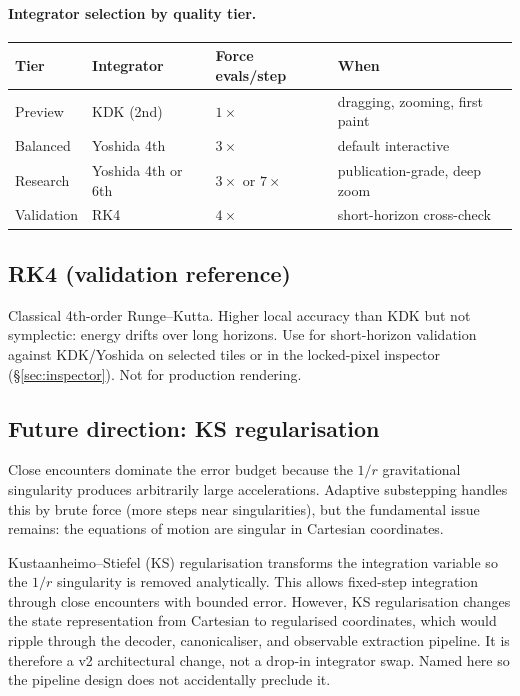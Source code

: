 \documentclass[11pt]{report}
\begin{document}
\paragraph{Integrator selection by quality tier.}
\begin{center}
\begin{tabular}{llll}
\toprule
Tier & Integrator & Force evals/step & When \\
\midrule
Preview & KDK (2nd) & $1\times$ & dragging, zooming, first paint \\
Balanced & Yoshida 4th & $3\times$ & default interactive \\
Research & Yoshida 4th or 6th & $3\times$ or $7\times$ & publication-grade, deep zoom \\
Validation & RK4 & $4\times$ & short-horizon cross-check \\
\bottomrule
\end{tabular}
\end{center}

\subsection{RK4 (validation reference)}

Classical 4th-order Runge--Kutta. Higher local accuracy than KDK but not symplectic: energy drifts over long horizons. Use for short-horizon validation against KDK/Yoshida on selected tiles or in the locked-pixel inspector (\S\ref{sec:inspector}). Not for production rendering.

\subsection{Future direction: KS regularisation}

Close encounters dominate the error budget because the $1/r$ gravitational singularity produces arbitrarily large accelerations. Adaptive substepping handles this by brute force (more steps near singularities), but the fundamental issue remains: the equations of motion are singular in Cartesian coordinates.

Kustaanheimo--Stiefel (KS) regularisation transforms the integration variable so the $1/r$ singularity is removed analytically. This allows fixed-step integration through close encounters with bounded error. However, KS regularisation changes the state representation from Cartesian to regularised coordinates, which would ripple through the decoder, canonicaliser, and observable extraction pipeline. It is therefore a v2 architectural change, not a drop-in integrator swap. Named here so the pipeline design does not accidentally preclude it.
\end{document}
